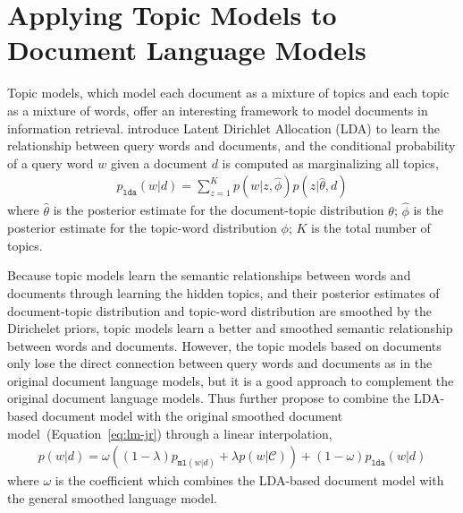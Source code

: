 
\section{Applying Topic Models to Document Language Models}

Topic models, which model each document as a mixture of topics and
each topic as a mixture of words, offer an interesting framework to
model documents in information retrieval. \cite{wei-06} introduce
Latent Dirichlet Allocation (LDA) to learn the relationship between
query words and documents, and the conditional probability of a query
word $w$ given a document $d$ is computed as marginalizing all topics,
\begin{align}
p_{\texttt{lda}}(w|d) = \sum_{z=1}^K p(w|z, \hat{\phi}) p(z |
\hat{\theta}, d)
\end{align}
where $\hat{\theta}$ is the posterior estimate for the document-topic distribution $\theta$; $\hat{\phi}$ is the posterior estimate for the topic-word distribution $\phi$; $K$ is the total number of topics.

Because topic models learn the semantic relationships between words
and documents through learning the hidden topics, and their posterior
estimates of document-topic distribution and topic-word distribution
are smoothed by the Dirichelet priors, topic models learn a better and
smoothed semantic relationship between words and documents. However,
the topic models based on documents only lose the direct connection
between query words and documents as in the original document language
models, but it is a good approach to complement the original document
language models. Thus \cite{wei-06} further propose to combine the
LDA-based document model with the original smoothed document
model~(Equation~\ref{eq:lm-jr}) through a linear interpolation,
\begin{align}
p(w|d) = \omega ((1 - \lambda) p_{\texttt{ml}(w|d)} + \lambda
p(w|\mathcal{C})) + (1 - \omega) p_{\texttt{lda}}(w|d)
\end{align}
where $\omega$ is the coefficient which combines the LDA-based
document model with the general smoothed language model.

